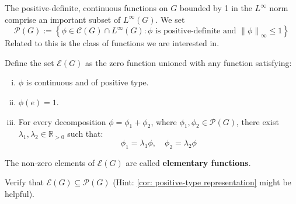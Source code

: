 \documentclass[11pt, x11names, openany]{book}
\newcommand{\rr}{\mathbb{R}}
\newcommand{\fanc}{\mathscr{C}}
\newcommand{\fane}{\mathscr{E}}
\newcommand{\fanp}{\mathscr{P}}
\newcommand{\set}[1]{\left\{ #1 \right\}}
\newcommand{\norm}[1]{\left\lVert #1 \right \rVert}
\begin{document}
The positive-definite, continuous functions on $G$ bounded by 1 in the $L^\infty$ norm comprise an important subset of $L^\infty(G)$. We set 
\begin{equation*}
    \fanp(G) := \set{\phi \in \fanc(G) \cap L^\infty(G) : \phi \text{ is positive-definite and } \norm{\phi}_\infty \leq 1}
\end{equation*}
Related to this is the class of functions we are interested in.
\begin{defn}
    Define the set $\fane(G)$ as the zero function unioned with any function satisfying:
    \begin{enumerate}[(i)]
        \item $\phi$ is continuous and of positive type.
        \item $\phi(e) = 1$.
        \item For every decomposition $\phi = \phi_1 + \phi_2$, where $\phi_1,\phi_2 \in \fanp(G)$, there exist $\lambda_1, \lambda_2 \in \rr_{> 0}$ such that:
        \begin{equation*}
            \phi_1 = \lambda_1 \phi, \quad \phi_2 = \lambda_2 \phi
        \end{equation*}
    \end{enumerate}
    The non-zero elements of $\fane(G)$ are called \textbf{elementary functions}.
\end{defn}

\begin{sanitycheck}
    Verify that $\fane(G) \subseteq \fanp(G)$ (Hint: \ref{cor: positive-type representation} might be helpful).
\end{sanitycheck}
\end{document}
